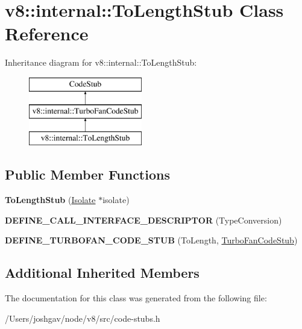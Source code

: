 \hypertarget{classv8_1_1internal_1_1_to_length_stub}{}\section{v8\+:\+:internal\+:\+:To\+Length\+Stub Class Reference}
\label{classv8_1_1internal_1_1_to_length_stub}
Inheritance diagram for v8\+:\+:internal\+:\+:To\+Length\+Stub\+:\begin{figure}[H]
\begin{center}
\leavevmode
\includegraphics[height=3.000000cm]{classv8_1_1internal_1_1_to_length_stub}
\end{center}
\end{figure}
\subsection*{Public Member Functions}
\begin{DoxyCompactItemize}
\item 
{\bfseries To\+Length\+Stub} (\hyperlink{classv8_1_1internal_1_1_isolate}{Isolate} $\ast$isolate)\hypertarget{classv8_1_1internal_1_1_to_length_stub_a74e8e977c1bf5a2644880f6999e1940d}{}\label{classv8_1_1internal_1_1_to_length_stub_a74e8e977c1bf5a2644880f6999e1940d}

\item 
{\bfseries D\+E\+F\+I\+N\+E\+\_\+\+C\+A\+L\+L\+\_\+\+I\+N\+T\+E\+R\+F\+A\+C\+E\+\_\+\+D\+E\+S\+C\+R\+I\+P\+T\+OR} (Type\+Conversion)\hypertarget{classv8_1_1internal_1_1_to_length_stub_a524ec6c5840fe11e452b06b28772c1e4}{}\label{classv8_1_1internal_1_1_to_length_stub_a524ec6c5840fe11e452b06b28772c1e4}

\item 
{\bfseries D\+E\+F\+I\+N\+E\+\_\+\+T\+U\+R\+B\+O\+F\+A\+N\+\_\+\+C\+O\+D\+E\+\_\+\+S\+T\+UB} (To\+Length, \hyperlink{classv8_1_1internal_1_1_turbo_fan_code_stub}{Turbo\+Fan\+Code\+Stub})\hypertarget{classv8_1_1internal_1_1_to_length_stub_a75b6ab18ac0aa453a1bd76732b86ef09}{}\label{classv8_1_1internal_1_1_to_length_stub_a75b6ab18ac0aa453a1bd76732b86ef09}

\end{DoxyCompactItemize}
\subsection*{Additional Inherited Members}


The documentation for this class was generated from the following file\+:\begin{DoxyCompactItemize}
\item 
/\+Users/joshgav/node/v8/src/code-\/stubs.\+h\end{DoxyCompactItemize}
